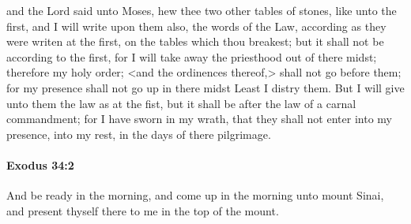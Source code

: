 			\begin{framed}
			\scriptsize
				\begin{compactdesc}
					\item[OTR2] and the Lord said unto Moses, hew thee two other tables of stones, like unto the first, and I will write upon them also, the words of the Law, according as they were writen at the first, on the tables which thou breakest; but it shall not be according to the first, for I will take away the priesthood out of there midst; therefore my holy order; <and the ordinences thereof,> shall not go before them; for my presence shall not go up in there midst Least I distry them. But I will give unto them the law as at the fist, but it shall be after the law of a carnal commandment; for I have sworn in my wrath, that they shall not enter into my presence, into my rest, in the days of there pilgrimage.
				\end{compactdesc}
			\end{framed}

		\paragraph{Exodus 34:2} %
			\label{EXODUS-34-2}

			And be ready in the morning, and come up in the morning unto mount Sinai, and present thyself there to me in the top of the mount.

